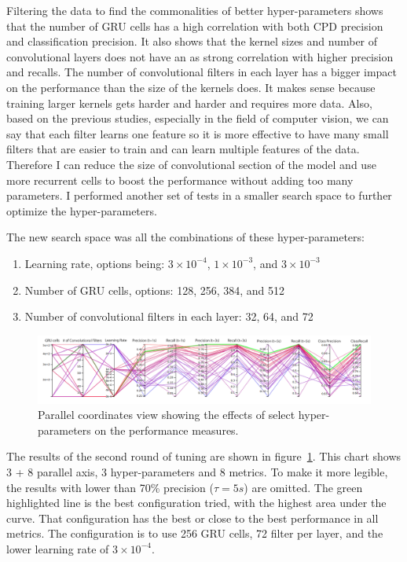 Filtering the data to find the commonalities of better hyper-parameters shows that the number of GRU cells has a high correlation with both CPD precision and classification precision. 
It also shows that the kernel sizes and number of convolutional layers does not have an as strong correlation with higher precision and recalls. The number of convolutional filters in each layer has a bigger impact on the performance than the size of the kernels does. 
It makes sense because training larger kernels gets harder and harder and requires more data. Also, based on the previous studies, especially in the field of computer vision, we can say that each filter learns one feature so it is more effective to have many small filters that are easier to train and can learn multiple features of the data.
Therefore I can reduce the size of convolutional section of the model and use more recurrent cells to boost the performance without adding too many parameters. I performed another set of tests in a smaller search space to further optimize the hyper-parameters.

The new search space was all the combinations of these hyper-parameters:

\begin{enumerate}
    \item Learning rate, options being: $3\times10^{-4}$, $1\times10^{-3}$, and $3\times10^{-3}$
    \item Number of GRU cells, options: 128, 256, 384, and 512
    \item Number of convolutional filters in each layer: 32, 64, and 72
\end{enumerate}

\begin{figure}
    \centering
    \includegraphics[width=\columnwidth]{RQ3-5_charts/refined_prec_recall_white_background.png}
    \caption{Parallel coordinates view showing the effects of select hyper-parameters on the performance measures.}
    \label{fig:precision_recall_parallel_coordinates}
\end{figure}
The results of the second round of tuning are shown in figure~\ref{fig:precision_recall_parallel_coordinates}. This chart shows 3 + 8 parallel axis, 3 hyper-parameters and 8 metrics. To make it more legible, the results with lower than 70\% precision ($\tau = 5s$) are omitted.
The green highlighted line is the best configuration tried, with the highest area under the curve. That configuration has the best or close to the best performance in all metrics. The configuration is to use 256 GRU cells, 72 filter per layer, and the lower learning rate of $3\times10^{-4}$.

